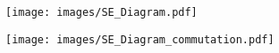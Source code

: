 
\noident
\hspace{-0.1\linewidth}
\begin{minipage}{0.48\linewidth}
  \centering
\texttt{[image: images/SE\_Diagram.pdf]}
\end{minipage}
\hspace{-0.05\linewidth}
\begin{minipage}{0.48\linewidth}
\texttt{[image: images/SE\_Diagram\_commutation.pdf]}
\end{minipage}
